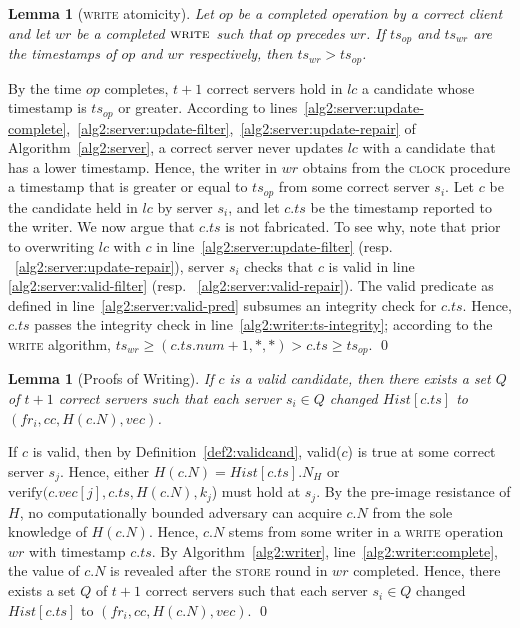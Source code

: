 \documentclass[10pt,conference,compsocconf]{IEEEtran}
\newtheorem{la}[defn]{Lemma}
\newenvironment{prooff}{\vspace{1ex}\noindent{\bf Proof:}\hspace{0.5em}}
	{\hfill\qed\vspace{1em}}
\begin{document}
\begin{la}[\textsc{write} atomicity]\label{la2:powr}
Let $op$ be a completed operation by a correct client and let $wr$ be a completed $\textsc{write}$ such that $op$ precedes $wr$. If $ts_{op}$ and $ts_{wr}$ are the timestamps of $op$ and $wr$ respectively, then $ts_{wr}>ts_{op}$.
\end{la}
\begin{prooff} By the time $op$ completes, $t+1$ correct servers hold in $lc$ a candidate whose timestamp is $ts_{op}$ or greater. According to lines~\ref{alg2:server:update-complete},~\ref{alg2:server:update-filter},~\ref{alg2:server:update-repair} of Algorithm~\ref{alg2:server}, a correct server never updates $lc$ with a candidate that has a lower timestamp. Hence, the writer in $wr$ obtains from the \textsc{clock} procedure a timestamp that is greater or equal to $ts_{op}$ from some correct server $s_i$. Let $c$ be the candidate held in $lc$ by server $s_i$, and let $c.ts$ be the timestamp reported to the writer. We now argue that $c.ts$ is not fabricated. To see why, note that prior to overwriting $lc$ with $c$ in line~\ref{alg2:server:update-filter} (resp. ~\ref{alg2:server:update-repair}), server $s_i$ checks that $c$ is valid in line \ref{alg2:server:valid-filter} (resp. ~\ref{alg2:server:valid-repair}). The \textsf{valid} predicate as defined in line~\ref{alg2:server:valid-pred} subsumes an integrity check for $c.ts$. Hence, $c.ts$ passes the integrity check in line~\ref{alg2:writer:ts-integrity}; according to the \textsc{write} algorithm, $ts_{wr} \geq (c.ts.num+1, *, *) > c.ts \geq ts_{op}$.
\end{prooff}

\begin{la}[Proofs of Writing] \label{la2:pow}
If $c$ is a valid candidate, then there exists a set $Q$ of $t+1$ correct servers such that each server $s_i \in Q$ changed $Hist[c.ts]$ to $(fr_i,cc,H(c.N),vec)$.
\end{la}
\begin{prooff}
If $c$ is valid, then by Definition~\ref{def2:validcand}, \textsf{valid}($c$) is true at some correct server $s_j$. Hence, either $H(c.N) = Hist[c.ts].N_H$ or $\mathrm{verify}(c.vec[j], c.ts, H(c.N), k_j$) must hold at $s_j$. By the pre-image resistance of $H$, no computationally bounded adversary can acquire $c.N$ from the sole knowledge of $H(c.N)$. Hence, $c.N$ stems from some writer in a \textsc{write} operation $wr$ with timestamp $c.ts$. By Algorithm~\ref{alg2:writer}, line~\ref{alg2:writer:complete}, the value of $c.N$ is revealed after the \textsc{store} round in $wr$ completed. Hence, there exists a set $Q$ of $t+1$ correct servers such that each server $s_i \in Q$ changed $Hist[c.ts]$ to $(fr_i,cc,H(c.N),vec)$.
\end{prooff}
\end{document}
